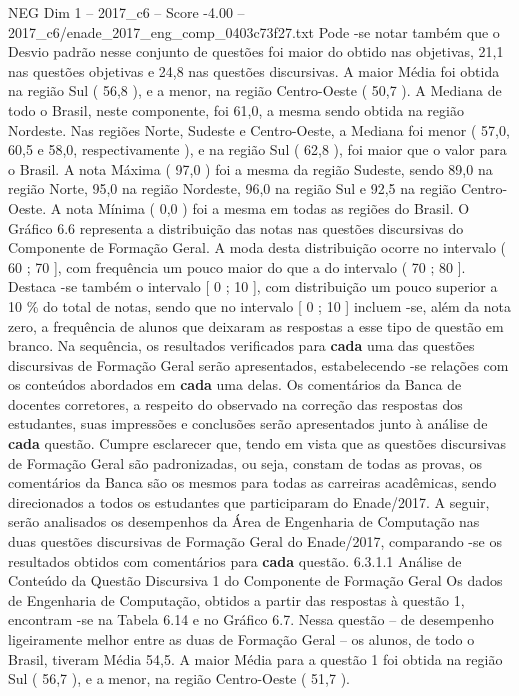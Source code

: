 \begin{textsample}{NEG Dim 1 – 2017\_c6 – Score -4.00 – 2017\_c6/enade\_2017\_eng\_comp\_0403c73f27.txt}
Pode -se notar também que o Desvio padrão nesse conjunto de questões foi maior do obtido nas objetivas, 21,1 nas questões objetivas e 24,8 nas questões discursivas.
A maior Média foi obtida na região Sul ( 56,8 ), e a menor, na região Centro-Oeste ( 50,7 ).
A Mediana de todo o Brasil, neste componente, foi 61,0, a mesma sendo obtida na região Nordeste.
Nas regiões Norte, Sudeste e Centro-Oeste, a Mediana foi menor ( 57,0, 60,5 e 58,0, respectivamente ), e na região Sul ( 62,8 ), foi maior que o valor para o Brasil.
A nota Máxima ( 97,0 ) foi a mesma da região Sudeste, sendo 89,0 na região Norte, 95,0 na região Nordeste, 96,0 na região Sul e 92,5 na região Centro-Oeste.
A nota Mínima ( 0,0 ) foi a mesma em todas as regiões do Brasil.
O Gráfico 6.6 representa a distribuição das notas nas questões discursivas do Componente de Formação Geral.
A moda desta distribuição ocorre no intervalo ( 60 ; 70 ], com frequência um pouco maior do que a do intervalo ( 70 ; 80 ].
Destaca -se também o intervalo [ 0 ; 10 ], com distribuição um pouco superior a 10 \% do total de notas, sendo que no intervalo [ 0 ; 10 ] incluem -se, além da nota zero, a frequência de alunos que deixaram as respostas a esse tipo de questão em branco.
Na sequência, os resultados verificados para \textbf{cada} uma das questões discursivas de Formação Geral serão apresentados, estabelecendo -se relações com os conteúdos abordados em \textbf{cada} uma delas.
Os comentários da Banca de docentes corretores, a respeito do observado na correção das respostas dos estudantes, suas impressões e conclusões serão apresentados junto à análise de \textbf{cada} questão.
Cumpre esclarecer que, tendo em vista que as questões discursivas de Formação Geral são padronizadas, ou seja, constam de todas as provas, os comentários da Banca são os mesmos para todas as carreiras acadêmicas, sendo direcionados a todos os estudantes que participaram do Enade/2017.
A seguir, serão analisados os desempenhos da Área de Engenharia de Computação nas duas questões discursivas de Formação Geral do Enade/2017, comparando -se os resultados obtidos com comentários para \textbf{cada} questão. 6.3.1.1 Análise de Conteúdo da Questão Discursiva 1 do Componente de Formação Geral Os dados de Engenharia de Computação, obtidos a partir das respostas à questão 1, encontram -se na Tabela 6.14 e no Gráfico 6.7.
Nessa questão – de desempenho ligeiramente melhor entre as duas de Formação Geral – os alunos, de todo o Brasil, tiveram Média 54,5.
A maior Média para a questão 1 foi obtida na região Sul ( 56,7 ), e a menor, na região Centro-Oeste ( 51,7 ).

\end{textsample}
